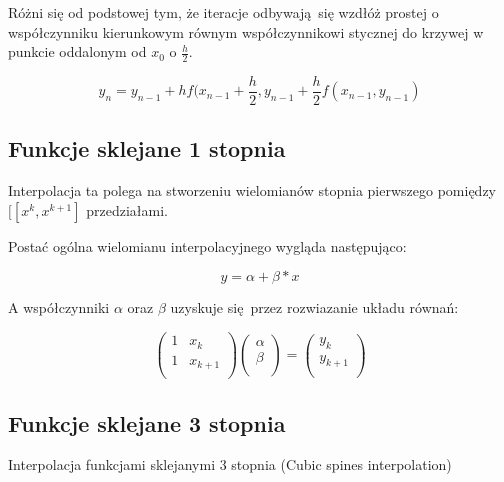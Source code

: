 \documentclass[varwidth,12pt,a4paper]{article}
\begin{document}
Różni się od podstowej tym, że iteracje odbywają się wzdłóż prostej o współczynniku
kierunkowym równym współczynnikowi stycznej do krzywej w punkcie oddalonym od 
$x_0$ o $\frac{h}{2}$.

\begin{equation}
    y_n = y_{n-1} + hf(x_{n-1} + \frac{h}{2}, y_{n-1} + \frac{h}{2} f(x_{n-1}, y_{n-1})
\end{equation}



\subsection{Funkcje sklejane 1 stopnia}

Interpolacja ta polega na stworzeniu wielomianów stopnia pierwszego pomiędzy $ [[x^k, x^{k+1}] $ przedziałami.

Postać ogólna wielomianu interpolacyjnego wygląda następująco:

\begin{equation}
    y = \alpha + \beta * x
\end{equation}

A współczynniki $\alpha$ oraz $\beta$ uzyskuje się przez rozwiazanie układu równań:

$$
\left( \begin{array}{cc}
    1 & x_k \\
    1 & x_{k + 1} \\
\end{array} \right) \left( \begin{array}{c}
\alpha\\
\beta \\
\end{array} \right) = \left( \begin{array}{c}
    y_k \\
    y_{k + 1} \\
\end{array} \right) 
$$



\subsection{Funkcje sklejane 3 stopnia}

Interpolacja funkcjami sklejanymi 3 stopnia (Cubic spines interpolation)
\end{document}
